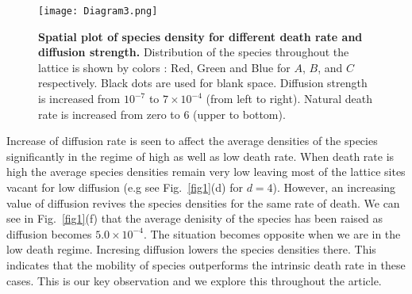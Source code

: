 \documentclass[aps, pre, twocolumn, amsmath, superscriptaddress,showkeys,showpacs]{revtex4-1}
\begin{document}
\begin{figure}
	\texttt{[image: Diagram3.png]}
	\caption{{\bf Spatial plot of species density for different death rate and diffusion strength.} Distribution of the species throughout the lattice is shown by colors : Red, Green and Blue for $A$, $B$, and $C$ respectively.  Black dots are  used for blank space. Diffusion strength is increased from $10^{-7}$ to $7\times 10^{-4}$ (from left to right). Natural death rate is increased from zero to $6$ (upper to bottom). }
	\label{fig3-spiral}
\end{figure}
{\color{red} Increase of diffusion rate is seen to affect the average densities of the species significantly in the regime of high as well as low death rate. When death rate is high the average species densities remain very low leaving most of the lattice sites vacant for low diffusion (e.g see Fig.\ \ref{fig1}(d) for $d=4$). %
However, an increasing value of diffusion revives the species densities for the same rate of death. We can see in Fig.~\ref{fig1}(f) that the average denisity of the species has been raised as diffusion becomes $5.0\times10^{-4}$. The situation becomes opposite when we are in the low death regime. Incresing diffusion lowers the species densities there. This indicates that  the mobility of species outperforms the intrinsic death rate in these cases.} %
This is our key observation and we explore this throughout the article. 
\end{document}
